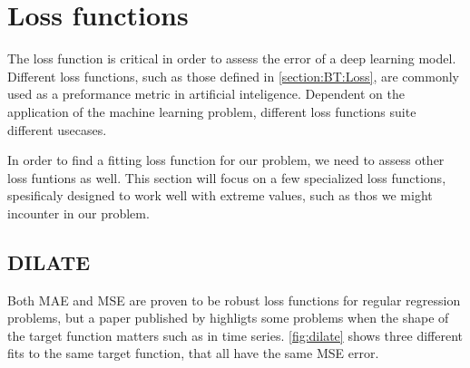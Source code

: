 
\section{Loss functions}
\label{section:RelatedWork:Loss}

The loss function is critical in order to assess the error of a deep learning model.
Different loss functions, such as those defined in \ref{section:BT:Loss},
are commonly used as a preformance metric in artificial inteligence.
Dependent on the application of the machine learning problem, different loss functions suite different usecases.

In order to find a fitting loss function for our problem, we need to assess other loss funtions as well.
This section will focus on a few specialized loss functions, spesificaly designed to work well with extreme values, such as thos we might incounter in our problem.

\subsection{DILATE}

Both MAE and MSE are proven to be robust loss functions for regular regression problems,
but a paper published by \citeauthor{Guen2019} highligts some problems when the shape of the target function matters
such as in time series.
\autoref{fig:dilate} shows three different fits to the same target function, that all have
the same MSE error.

